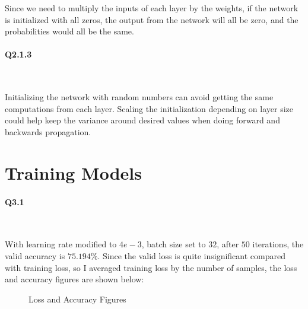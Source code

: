 \documentclass[11pt]{article} \usepackage{fullpage} \usepackage{graphicx} \usepackage{epstopdf} \usepackage{color} \usepackage{psfrag} \usepackage{pdfsync}\usepackage{indentfirst}\usepackage{subfigure}\usepackage{float}\usepackage[section]{placeins}
\begin{document}
Since we need to multiply the inputs of each layer by the weights, if the network is initialized with all zeros, the output from the network will all be zero, and the probabilities would all be the same.

\paragraph{Q2.1.3}~{}

Initializing the network with random numbers can avoid getting the same computations from each layer. Scaling the initialization depending on layer size could help keep the variance around desired values when doing forward and backwards propagation.

\section{Training Models}

\paragraph{Q3.1}~{}

With learning rate modified to $4e-3$, batch size set to $32$, after $50$ iterations, the valid accuracy is $75.194\%$. Since the valid loss is quite insignificant compared with training loss, so I averaged training loss by the number of samples, the loss and accuracy figures are shown below:
\begin{figure}[H]
\centering
{}
\caption{Loss and Accuracy Figures}
\end{figure}
\end{document}
